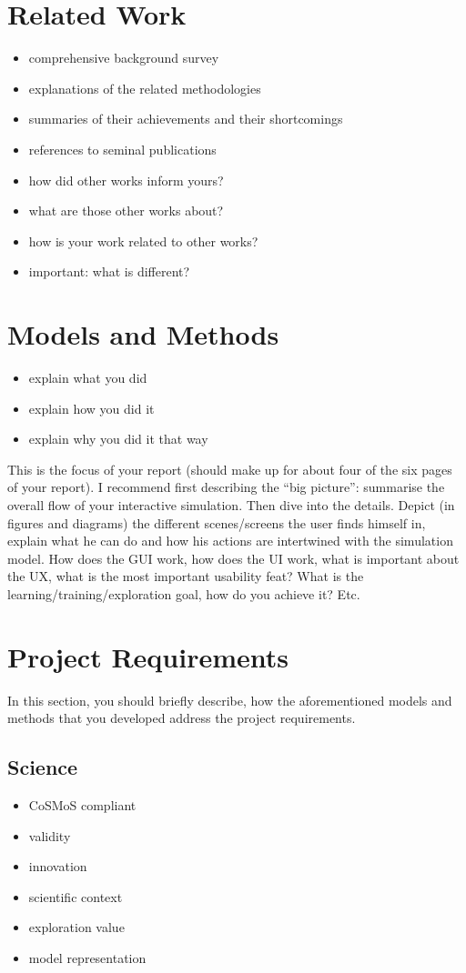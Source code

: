 \documentclass{sig-alternate-05-2015}
\begin{document}
\section{Related Work}
\begin{itemize}
\item comprehensive background survey
\item explanations of the related methodologies
\item summaries of their achievements and their shortcomings
\item references to seminal publications
\item how did other works inform yours?
\item what are those other works about?
\item how is your work related to other works?
\item important: what is different?
\end{itemize}

\section{Models and Methods}
\begin{itemize}
\item explain what you did
\item explain how you did it
\item explain why you did it that way
\end{itemize}
This is the focus of your report (should make up for about four of the six pages of your report). I recommend first describing the ``big picture'': summarise the overall flow of your interactive simulation. Then dive into the details. Depict (in figures and diagrams) the different scenes/screens the user finds himself in, explain what he can do and how his actions are intertwined with the simulation model. How does the GUI work, how does the UI work, what is important about the UX, what is the most important usability feat? What is the learning/training/exploration goal, how do you achieve it? Etc.

\section{Project Requirements}
In this section, you should briefly describe, how the aforementioned models and methods that you developed address the project requirements. 

\subsection{Science}
\begin{itemize}
\item CoSMoS compliant
\item validity
\item innovation
\item scientific context
\item exploration value
\item model representation
\end{itemize}
\end{document}
